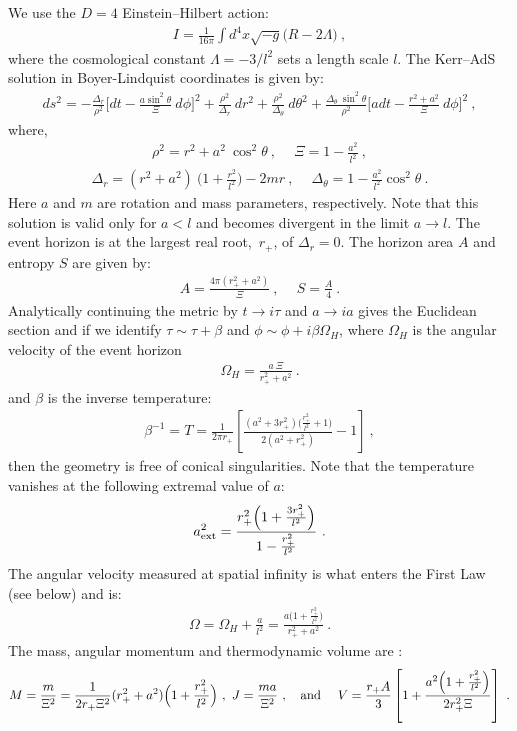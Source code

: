 \documentclass[letterpaper,11pt]{article}
\newcommand{\bea}{\begin{eqnarray}}
\newcommand{\eea}{\end{eqnarray}}
\begin{document}
We use the $D=4$ Einstein--Hilbert action:
\bea \label{EHaction}
I=\frac{1}{16\pi}\int d^4 x\sqrt{-g}\Big(R-2\Lambda \Big) \ ,
\eea where the cosmological constant $\Lambda=-3/l^2$ sets a length scale $l$. The Kerr--AdS solution  in Boyer-Lindquist coordinates is given by:
\bea \label{metric}
ds^2=-\frac{\Delta_{r}}{\rho ^2}\Big[dt-\frac{a \sin^2 \theta}{\Xi} \ d\phi \Big]^2+\frac{\rho ^2}{\Delta_{r}} \ dr^2+\frac{\rho ^2}{\Delta_{\theta}} \ d\theta ^2+\frac{\Delta_{\theta} \ \sin^{2}\theta}{\rho ^2} \Big[a dt-\frac{r^2+a^2}{\Xi} \ d\phi \Big]^2 \ , 
\eea 
where,
\bea
\rho^2 =r^2+a^2 \ \cos^2 \theta \ ,\quad  \ \Xi =1-\frac{a^2}{l^2} \ ,
\eea
\bea \label{radial}
\Delta_{r}=(r^2+a^2) \ \Big(1+\frac{r^2}{l^2}\Big)-2mr \ ,\quad \ \Delta_{\theta}=1-\frac{a^2}{l^2}  \cos^2 \theta \ .
\eea
Here $a$ and $m$ are rotation and mass parameters, respectively. Note that this solution is valid only for $a<l$ and becomes divergent in the limit $a \rightarrow l$. The event horizon is at  the largest real root,~$r_+$, of  $\Delta_{r}=0$. The horizon area $A$ and entropy $S$ are  given by:
\bea \label{entropy}
A=\frac{4 \pi (r^2_{+}+a^2)}{\Xi} \ , \quad \ S=\frac{A}{4}\ .
\eea
Analytically continuing the metric by $t \rightarrow i \tau $ and $a \rightarrow ia$ gives the Euclidean section and if  we  identify $\tau \sim \tau + \beta$ and $\phi \sim \phi + i\beta \Omega_{H}$, where $\Omega_{H}$ is the angular velocity of the event horizon
\bea
\Omega_{H}=\frac{a \ \Xi}{r^2_{+}+a^2} \ .
\eea
and $\beta$ is the inverse  temperature:
\bea \label{temp}
\beta^{-1}=T=\frac{1}{2 \pi r_{+}} \left[\frac{(a^2+3r^2_{+})\Big(\frac{r^2_{+}}{l^2}+1\Big)}{2(a^2+r^2_{+})}-1 \right] \ ,
\eea
then the geometry is free of conical singularities. Note that the temperature vanishes at the following extremal value of $a$: 
\bea \label{eq:extremal}
a^2_{\rm ext}=\frac{r^2_{+}\Big(1+\frac{3r^2_{+}}{l^2}\Big)}{1-\frac{r^2_{+}}{l^2}}\ . %
\eea
The angular velocity measured at spatial infinity is what enters the First Law \cite{Cvetic:2010jb} (see below) and is:
\bea \label{AngVelSp}
\Omega=\Omega_{H}+\frac{a}{l^2}=\frac{a\Big(1+\frac{r^2_{+}}{l^2}\Big)}{r^2_{+}+a^2} \ .
\eea
The mass, angular momentum and thermodynamic volume  are \cite{Cvetic:2010jb}:
\bea \label{volume}
M=\frac{m}{\Xi^2} =
\frac{1}{2r_{+}\Xi^2}(r^2_{+}+a^2)\Big(1+\frac{r^2_{+}}{l^2}\Big)\ , \ J=\frac{ma}{\Xi^2} \ , \quad {\rm and} \quad \ V=\frac{r_{+}A}{3}\left[1+\frac{a^2\Big(1+\frac{r^2_{+}}{l^2}\Big)}{2 r^2_{+} \Xi}\right]\ .
\eea
\end{document}
